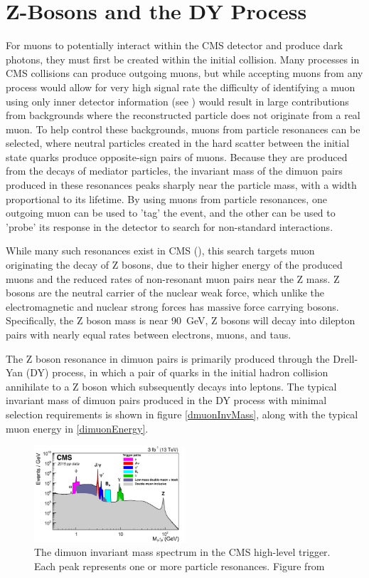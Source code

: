 \section{Z-Bosons and the DY Process}
For muons to potentially interact within the CMS detector and produce dark photons, they must first be created within the initial collision.
Many processes in CMS collisions can produce outgoing muons, but while accepting muons from any process would allow for very high signal rate the difficulty of identifying a muon using only inner detector information (see ) would result in large contributions from backgrounds where the reconstructed particle does not originate from a real muon.
To help control these backgrounds, muons from particle resonances can be selected, where neutral particles created in the hard scatter between the initial state quarks produce opposite-sign pairs of muons.
Because they are produced from the decays of mediator particles, the invariant mass of the dimuon pairs produced in these resonances peaks sharply near the particle mass, with a width proportional to its lifetime. 
By using muons from particle resonances, one outgoing muon can be used to 'tag' the event, and the other can be used to 'probe' its response in the detector to search for non-standard interactions. 

While many such resonances exist in CMS (), this search targets muon originating the decay of Z bosons, due to their higher energy of the produced muons and the reduced rates of non-resonant muon pairs near the Z mass.
Z bosons are the neutral carrier of the nuclear weak force, which unlike the electromagnetic and nuclear strong forces has massive force carrying bosons.
Specifically, the Z boson mass is near \SI{90}{\giga\eV}, 
Z bosons will decay into dilepton pairs with nearly equal rates between electrons, muons, and taus. 

The Z boson resonance in dimuon pairs is primarily produced through the Drell-Yan (DY) process, in which a pair of quarks in the initial hadron collision annihilate to a Z boson which subsequently decays into leptons.
The typical invariant mass of dimuon pairs produced in the DY process with minimal selection requirements is shown in figure \ref{dmuonInvMass}, along with the typical muon energy in \ref{dimuonEnergy}.

\begin{figure}[ht]
	\label{fig:diMuonSpectrum}
	\centering
	\caption[Inclusive dimuon spectrum in CMS]{The dimuon invariant mass spectrum in the CMS high-level trigger. Each peak represents one or more particle resonances. Figure from \cite{cmsMuonPerformance}}
	\includegraphics[width=0.5\textwidth]{figures/cms_diMuonSpectrum.jpg}
\end{figure}


